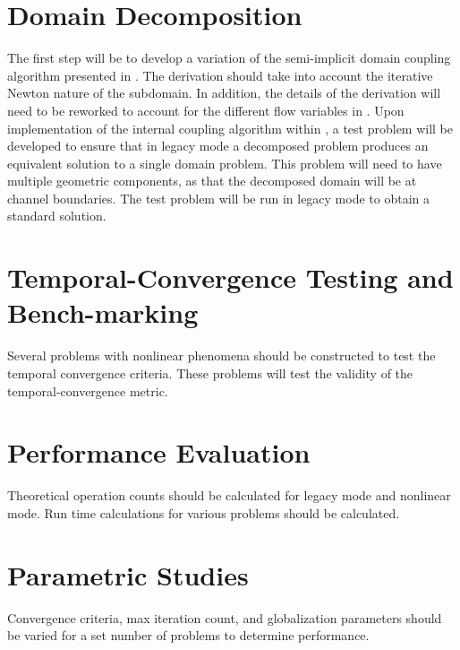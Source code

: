 \section{Domain Decomposition}
\label{sect:domain_coupling}
The first step will be to develop a variation of the semi-implicit domain coupling algorithm presented in .
The derivation should take into account the iterative Newton nature of the subdomain. 
In addition, the details of the derivation will need to be reworked to account for the different flow variables in \cobra{}.
Upon implementation of the internal coupling algorithm within \cobra{}, a test problem will be developed to ensure that in legacy mode a decomposed problem produces an equivalent solution to a single domain problem.
This problem will need to have multiple geometric components, as that the decomposed domain will be at channel boundaries.
The test problem will be run in legacy mode to obtain a standard solution.

\section{Temporal-Convergence Testing and Bench-marking}
\label{sect:proposal_temporal_testing}
Several problems with nonlinear phenomena should be constructed to test the temporal convergence criteria.
These problems will test the validity of the temporal-convergence metric.

\section{Performance Evaluation}
\label{sect:proposal_performance_evaluation}
Theoretical operation counts should be calculated for legacy mode and nonlinear mode.
Run time calculations for various problems should be calculated.


\section{Parametric Studies}
\label{sect:proposal_parametric_studies}
Convergence criteria, max iteration count, and globalization parameters should be varied for a set number of problems to determine performance.

